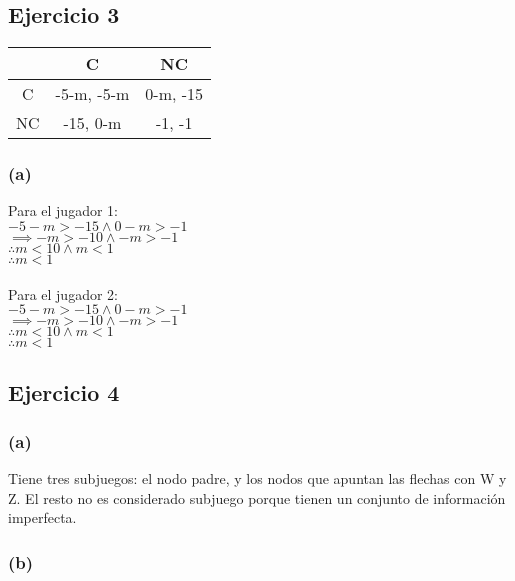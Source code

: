 \documentclass{article}
\begin{document}
        \subsection*{Ejercicio 3}
            \begin{table}[H]
                \begin{tabular}{|c|c|c|}
                    \hline
                        & C & NC \\ \hline
                    C & -5-m, -5-m & 0-m, -15 \\ 
                    NC & -15, 0-m & -1, -1 \\ \hline
                \end{tabular}
            \end{table}
            \subsubsection*{(a)}
                Para el jugador 1: \\
                \(-5-m > -15 \wedge 0-m > -1\) \\
                \(\implies -m > -10 \wedge -m > -1\) \\
                \(\therefore m < 10 \wedge m < 1\) \\
                \(\therefore m < 1\) \\
                \\
                Para el jugador 2: \\
                \(-5-m > -15 \wedge 0-m > -1\) \\
                \(\implies -m > -10 \wedge -m > -1\) \\
                \(\therefore m < 10 \wedge m < 1\) \\
                \(\therefore m < 1\) \\
        \subsection*{Ejercicio 4}
            \subsubsection*{(a)}
                Tiene tres subjuegos: el nodo padre, y los nodos que apuntan las flechas con W y Z. El resto no es considerado subjuego porque tienen un conjunto de información imperfecta.
            \subsubsection*{(b)}
                
\end{document}
